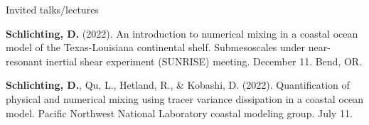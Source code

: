 \documentclass{resume} %
\begin{document}
\begin{rSection}{Invited talks/lectures}
\vspace{-3pt}

\begin{etaremune}
    \item \textbf{Schlichting, D.} (2022). An introduction to numerical mixing in a coastal ocean model of the Texas-Louisiana continental shelf. Submesoscales under near-resonant inertial shear experiment (SUNRISE) meeting. December 11. Bend, OR.
    \item \textbf{Schlichting, D.}, Qu, L., Hetland, R., \& Kobashi, D. (2022). Quantification of physical and numerical mixing using tracer variance dissipation in a coastal ocean model. Pacific Northwest National Laboratory coastal modeling group. July 11.
\end{etaremune}
\end{rSection}
\end{document}
